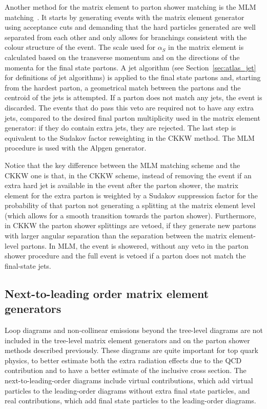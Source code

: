 Another method for the matrix element to parton shower matching is the MLM matching~\cite{mlm_matching}. It starts by generating events with the matrix element generator
using acceptance cuts and demanding that the hard particles generated are well separated from each other and only allows for branchings consistent with the colour structure
of the event. The scale used for $\alpha_S$ in the matrix element is calculated based on the transverse momentum and on the
directions of the momenta for the final state partons.
A jet algorithm
(see Section~\ref{sec:atlas_jet} for definitions of jet algorithms) is
applied to the final state partons and, starting from the hardest parton, a geometrical match between the partons and the centroid of the jets is attempted. If a parton
does not match any jets, the event is discarded. The events that do pass this veto are required not to have any extra jets, compared to the desired final parton
multiplicity used in the matrix element generator: if they do contain extra jets, they are rejected. The last step is equivalent to the Sudakov factor reweighting in the CKKW
method. The MLM procedure is used with the Alpgen generator.

Notice that the key difference between the MLM matching scheme and the CKKW
one is that, in the CKKW scheme, instead
of removing the event if an extra hard jet is
available in the event after the parton shower, the matrix element for the
extra parton
is weighted by
a Sudakov suppression factor for the probability of that parton not
generating a splitting at the matrix element level (which allows
for a smooth transition towards the parton shower). Furthermore, in CKKW
the parton shower splittings are vetoed, if they generate new partons
with larger angular separation than the separation between
the matrix element-level partons. In MLM, the event is
showered, without any veto in the parton shower procedure and
the full event is vetoed if a parton does not match the final-state
jets.

\subsection{Next-to-leading order matrix element generators}
\label{subsec:theory_nlo}

Loop diagrams and non-collinear emissions beyond the tree-level diagrams are not included in the tree-level matrix element generators and on the parton shower methods
described previously. These diagrams are quite important for top quark physics, to better estimate both the extra radiation effects due to the QCD contribution and to
have a better estimate of the inclusive cross section. The next-to-leading-order diagrams include virtual contributions, which add virtual particles to the
leading-order diagrams without extra final state particles, and real contributions, which add final state particles to the leading-order diagrams.

